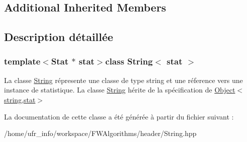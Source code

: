 \subsection*{Additional Inherited Members}


\subsection{Description détaillée}
\subsubsection*{template$<$Stat $\ast$ stat$>$class String$<$ stat $>$}

La classe \hyperlink{class_string}{String} répresente une classe de type string et une réference vers une instance de statistique. La classe \hyperlink{class_string}{String} hérite de la spécification de \hyperlink{class_object}{Object$<$string,stat$>$} 

La documentation de cette classe a été générée à partir du fichier suivant \-:\begin{DoxyCompactItemize}
\item 
/home/ufr\-\_\-info/workspace/\-F\-W\-Algorithms/header/String.\-hpp\end{DoxyCompactItemize}
